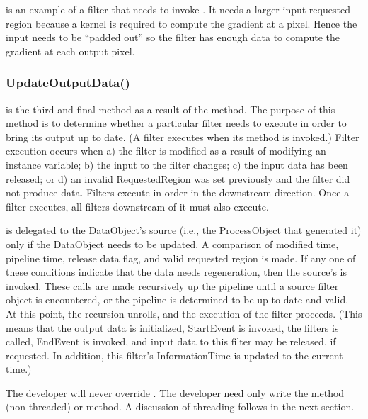  is an example of a filter that needs to
invoke . It needs a larger input requested
region because a kernel is required to compute the gradient at a pixel. Hence
the input needs to be ``padded out'' so the filter has enough data to compute
the gradient at each output pixel.

\subsubsection{UpdateOutputData()}
\label{sec:UpdateOutputData}

 is the third and final method as a result of the
 method. The purpose of this method is to determine whether a
particular filter needs to execute in order to bring its output up to date. (A
filter executes when its  method is invoked.) Filter
execution occurs when a) the filter is modified as a result of modifying an
instance variable; b) the input to the filter changes; c) the input data has
been released; or d) an invalid RequestedRegion was set previously and the
filter did not produce data. Filters execute in order in the downstream
direction.  Once a filter executes, all filters downstream of it must also
execute.

 is delegated to the DataObject's source
(i.e., the ProcessObject that generated it) only if the DataObject needs to be
updated. A comparison of modified time, pipeline time, release data flag, and
valid requested region is made. If any one of these conditions indicate that
the data needs regeneration, then the source's
 is invoked. These calls are made
recursively up the pipeline until a source filter object is encountered, or the
pipeline is determined to be up to date and valid. At this point, the recursion
unrolls, and the execution of the filter proceeds. (This means that the output
data is initialized, StartEvent is invoked, the filters 
is called, EndEvent is invoked, and input data to this filter may be released,
if requested. In addition, this filter's InformationTime is updated to the
current time.)

The developer will never override . The developer need
only write the  method (non-threaded) or
 method. A discussion of threading follows in the
next section.


